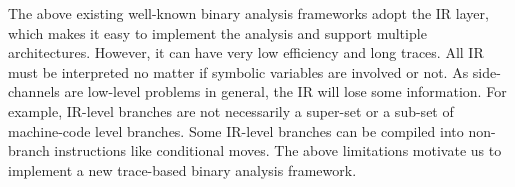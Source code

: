 The above existing well-known binary analysis frameworks adopt the IR layer, which makes it easy to implement the analysis and support multiple architectures. However, it can have very low efficiency and long traces. All IR must be interpreted no matter if symbolic variables are involved or not. As side-channels are low-level problems in general, the IR will lose some information. For example, IR-level branches are not necessarily a super-set or a sub-set of machine-code level branches. Some IR-level branches can be compiled into non-branch instructions like conditional moves. The above limitations motivate us to implement a new trace-based binary analysis framework.